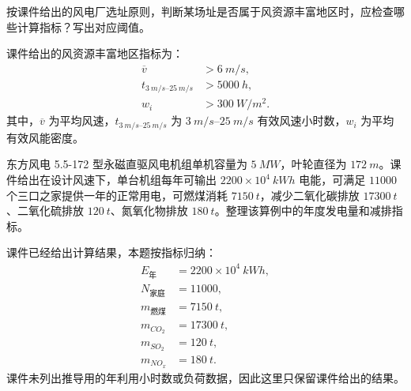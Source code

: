 \begin{problem}[风资源丰富区指标判断]\label{exer:calc_03_wind_p037_01}
按课件给出的风电厂选址原则，判断某场址是否属于风资源丰富地区时，应检查哪些计算指标？写出对应阈值。
\end{problem}

\begin{solution}
课件给出的风资源丰富地区指标为：
\begin{equation*}
\begin{aligned}
\overline{v} &> \qty{6}{m/s},\\
t_{\qtyrange{3}{25}{m/s}} &> \qty{5000}{h},\\
w_i &> \qty{300}{W/m^2}.
\end{aligned}
\end{equation*}
其中，\(\overline{v}\) 为平均风速，\(t_{\qtyrange{3}{25}{m/s}}\) 为 \(\qtyrange{3}{25}{m/s}\) 有效风速小时数，\(w_i\) 为平均有效风能密度。
\end{solution}

\begin{problem}[5.5-172 机组年发电量与减排量]\label{exer:calc_03_wind_p040_01}
东方风电 5.5-172 型永磁直驱风电机组单机容量为 \(\qty{5}{MW}\)，叶轮直径为 \(\qty{172}{m}\)。课件给出在设计风速下，单台机组每年可输出 \(2200 \times 10^4\ \unit{kWh}\) 电能，可满足 \(\num{11000}\) 个三口之家提供一年的正常用电，可燃煤消耗 \(\qty{7150}{t}\)，减少二氧化碳排放 \(\qty{17300}{t}\)、二氧化硫排放 \(\qty{120}{t}\)、氮氧化物排放 \(\qty{180}{t}\)。整理该算例中的年度发电量和减排指标。
\end{problem}

\begin{solution}
课件已经给出计算结果，本题按指标归纳：
\begin{equation*}
\begin{aligned}
E_{\text{年}} &= 2200 \times 10^4\ \unit{kWh},\\
N_{\text{家庭}} &= \num{11000},\\
m_{\text{燃煤}} &= \qty{7150}{t},\\
m_{CO_2} &= \qty{17300}{t},\\
m_{SO_2} &= \qty{120}{t},\\
m_{NO_x} &= \qty{180}{t}.
\end{aligned}
\end{equation*}
课件未列出推导用的年利用小时数或负荷数据，因此这里只保留课件给出的结果。
\end{solution}


